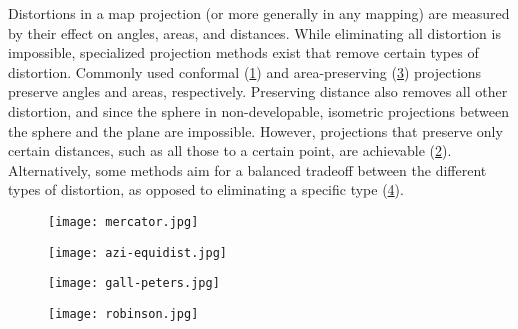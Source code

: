 Distortions in a map projection (or more generally in any mapping) are measured by their effect on angles, areas, and distances.
While eliminating all distortion is impossible, specialized projection methods exist that remove certain types of distortion.
Commonly used conformal (\cref{fig:mercator}) and area-preserving (\cref{fig:gall-peters}) projections preserve angles and areas, respectively.
Preserving distance also removes all other distortion, and since the sphere in non-developable, isometric projections between the sphere and the plane are impossible.
However, projections that preserve only certain distances, such as all those to a certain point, are achievable (\cref{fig:azi-equidist}).
Alternatively, some methods aim for a balanced tradeoff between the different types of distortion, as opposed to eliminating a specific type (\cref{fig:robinson}).


\begin{figure*}[htp!]
	\centering
	\begin{subfigure}[]{0.5\textwidth}
		\centering
		\texttt{[image: mercator.jpg]}
		\caption{}
		\label{fig:mercator}
	\end{subfigure}%
	\begin{subfigure}[]{0.5\textwidth}
		\centering
		\texttt{[image: azi-equidist.jpg]}
		\caption{}
		\label{fig:azi-equidist}
	\end{subfigure}%
	
	\begin{subfigure}[]{0.5\textwidth}
		\centering
		\texttt{[image: gall-peters.jpg]}
		\caption{}
		\label{fig:gall-peters}
	\end{subfigure}%
	\begin{subfigure}[]{0.5\textwidth}
		\centering
		\texttt{[image: robinson.jpg]}
		\caption{}
		\label{fig:robinson}
	\end{subfigure}
	
	\caption[Four popular map projections]{
		Four common map projections and special properties they possess: (a) Mercator~\cite{mercator}, conformal; (b) azimuthal equidistant~\cite{azi-equidist}, equidistant to centre point; (c) Gall-Peters~\cite{gall-peters}, equal area; and (d) Robinson~\cite{robinson}, compromise (no measures preserved).
		Images courtesy of Daniel R. Strebe -- CC BY-SA 3.0.
	}
	\label{fig:projections}
\end{figure*}


